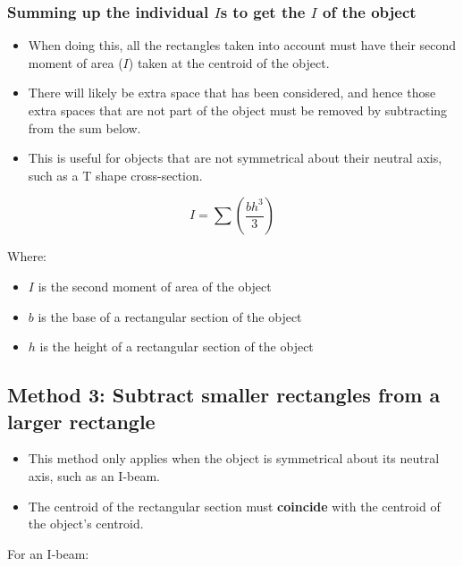 \documentclass[11pt]{article}
\begin{document}
\subsubsection{Summing up the individual \(I\)s to get the \(I\) of the object}
\label{sec:org93cd6a1}
\begin{itemize}
\item When doing this, all the rectangles taken into account must have their second moment of area (\(I\)) taken at the centroid of the object.
\item There will likely be extra space that has been considered, and hence those extra spaces that are not part of the object must be removed by subtracting from the sum below.
\item This is useful for objects that are not symmetrical about their neutral axis, such as a T shape cross-section.
\end{itemize}

\[I = \sum \left( \frac{bh^3}{3} \right)\]

Where:
\begin{itemize}
\item \(I\) is the second moment of area of the object
\item \(b\) is the base of a rectangular section of the object
\item \(h\) is the height of a rectangular section of the object
\end{itemize}

\newpage

\subsection{Method 3: Subtract smaller rectangles from a larger rectangle}
\label{sec:org8f7e73f}
\begin{itemize}
\item This method only applies when the object is symmetrical about its neutral axis, such as an I-beam.
\item The centroid of the rectangular section must \textbf{coincide} with the centroid of the object's centroid.
\end{itemize}

For an I-beam:
\end{document}
